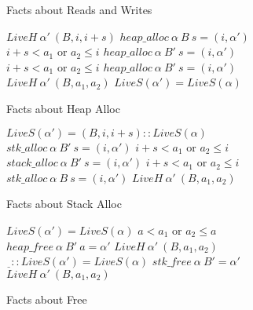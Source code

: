 \documentclass{article}
\begin{document}
\begin{figure}
\begin{subfigure}{0.5\textwidth}
  \caption{Facts about Reads and Writes}
  \end{subfigure}
  \begin{subfigure}{0.49\textwidth}
             {\(LiveH ~ \alpha' ~ (B,i,i+s)\)}
               {\(\mathit{heap\_alloc} ~ \alpha ~ B ~ s = (i, \alpha')\)}
               {\(i+s < a_1\) or \(a_2 \leq i\)}
               {\(\mathit{heap\_alloc} ~ \alpha ~ B' ~ s = (i, \alpha')\)}
               {\(i+s < a_1\) or \(a_2 \leq i\)}
               {\(\mathit{heap\_alloc} ~ \alpha ~ B' ~ s = (i, \alpha')\)}
               {\(LiveH ~ \alpha' ~ (B,a_1,a_2)\)}
             {\(LiveS(\alpha') = LiveS(\alpha)\)}
    \caption{Facts about Heap Alloc}  
  \end{subfigure}
  \begin{subfigure}{0.5\textwidth}
             {\(LiveS(\alpha') = (B,i,i+s)::LiveS(\alpha)\)}
               {\(\mathit{stk\_alloc} ~ \alpha ~ B' ~ s = (i, \alpha')\)}
               {\(i+s < a_1\) or \(a_2 \leq i\)}
               {\(\mathit{stack\_alloc} ~ \alpha ~ B' ~ s = (i, \alpha')\)}
               {\(i+s < a_1\) or \(a_2 \leq i\)}
               {\(\mathit{stk\_alloc} ~ \alpha ~ B ~ s = (i, \alpha')\)}
               {\(LiveH ~ \alpha' ~ (B,a_1,a_2)\)}
    \caption{Facts about Stack Alloc}
  \end{subfigure}
  \begin{subfigure}{0.49\textwidth}
             {\(LiveS(\alpha') = LiveS(\alpha)\)}
                 {\(a < a_1\) or \(a_2 \leq a\)}
                 {\(\mathit{heap\_free} ~ \alpha ~ B' ~ a = \alpha'\)}
                 {\(LiveH ~ \alpha' ~ (B,a_1,a_2)\)}
             {\(\underline{~~}::LiveS(\alpha') = LiveS(\alpha)\)}
               {\(\mathit{stk\_free} ~ \alpha ~ B' = \alpha'\)}
               {\(LiveH ~ \alpha' ~ (B,a_1,a_2)\)}
    \caption{Facts about Free}
  \end{subfigure}
  \begin{subfigure}{\textwidth}


\end{subfigure}
\end{figure}
\end{document}
